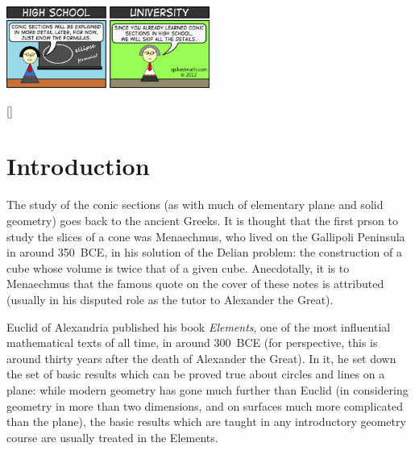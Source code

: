 \documentclass[a4paper,leqno,9pt]{article}
\theoremstyle{exercise}
\theoremstyle{plain}
\theoremstyle{definition}
\begin{document}
\begin{center}
  \includegraphics[width=0.5\textwidth]{conics}
\end{center}

[{\titlerule[0.8pt]}]
\let\oldsection\section
\renewcommand\section{\clearpage\oldsection}
\section{Introduction}
The study of the conic sections (as with much of elementary plane and solid geometry) goes back to the ancient Greeks. It is
thought that the first prson to study the slices of a cone was Menaechmus, who lived on the Gallipoli Peninsula in around 350~BCE,
in his solution of the Delian problem: the construction of a cube whose volume is twice that of a given cube. Anecdotally, it is to
Menaechmus that the famous quote on the cover of these notes is attributed (usually in his disputed role as the tutor to Alexander the Great).

Euclid of Alexandria published his book \emph{Elements}, one of the most influential mathematical texts of all time, in around
300~BCE (for perspective, this is around thirty years after the death of Alexander the Great). In it, he set down the set
of basic results which can be proved true about circles and lines on a plane: while modern geometry has gone much further than
Euclid (in considering geometry in more than two dimensions, and on surfaces much more complicated than the plane), the basic
results which are taught in any introductory geometry course are usually treated in the Elements.
\end{document}
